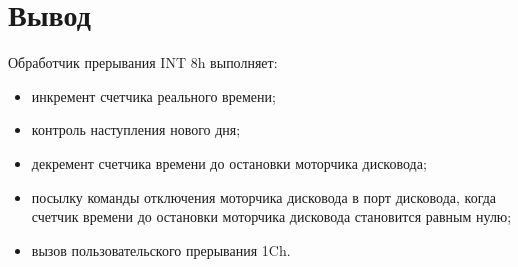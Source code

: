 \section*{Вывод}

Обработчик прерывания INT 8h выполняет:
\begin{itemize}[left= \parindent]
\item инкремент счетчика реального времени;
\item контроль наступления нового дня;
\item декремент счетчика времени до остановки моторчика дисковода;
\item посылку команды отключения моторчика дисковода в порт дисковода, когда счетчик времени до остановки моторчика дисковода становится равным нулю;
\item вызов пользовательского прерывания 1Ch.
\end{itemize}


